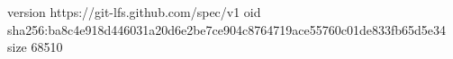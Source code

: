 version https://git-lfs.github.com/spec/v1
oid sha256:ba8c4e918d446031a20d6e2be7ce904c8764719ace55760c01de833fb65d5e34
size 68510
